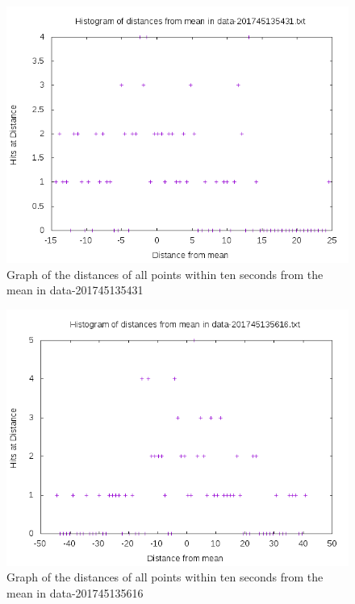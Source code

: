\documentclass[10pt,letterpaper]{article}
\begin{document}
\begin{figure}[h]
\centering
\includegraphics[scale=0.5]{data-201745135431.png}
\caption{\label{fig:data-201745135431.png}Graph of the distances of all points within ten seconds from the mean in data-201745135431}
\end{figure}
\begin{figure}[h]
\centering
\includegraphics[scale=0.5]{data-201745135616.png}
\caption{\label{fig:data-201745135616.png}Graph of the distances of all points within ten seconds from the mean in data-201745135616}
\end{figure}
\end{document}
